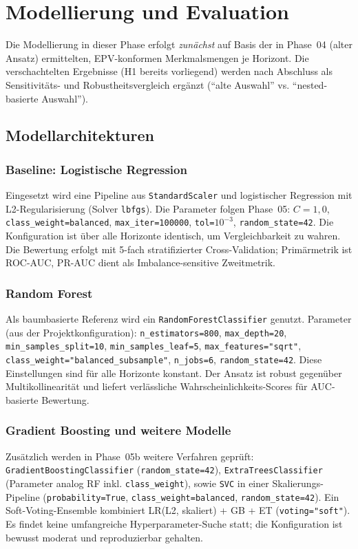 \chapter{Modellierung und Evaluation}

Die Modellierung in dieser Phase erfolgt \emph{zunächst} auf Basis der in Phase~04 (alter Ansatz) ermittelten, EPV-konformen Merkmalsmengen je Horizont. Die verschachtelten Ergebnisse (H1 bereits vorliegend) werden nach Abschluss als Sensitivitäts- und Robustheitsvergleich ergänzt (``alte Auswahl'' vs. ``nested-basierte Auswahl'').

\section{Modellarchitekturen}

\subsection{Baseline: Logistische Regression}
Eingesetzt wird eine Pipeline aus \texttt{StandardScaler} und logistischer Regression mit L2-Regularisierung (Solver \texttt{lbfgs}). Die Parameter folgen Phase~05: \mbox{$C=1{,}0$}, \texttt{class\_weight=balanced}, \texttt{max\_iter=100000}, \texttt{tol=$10^{-3}$}, \texttt{random\_state=42}. Die Konfiguration ist über alle Horizonte identisch, um Vergleichbarkeit zu wahren. Die Bewertung erfolgt mit 5-fach stratifizierter Cross-Validation; Primärmetrik ist ROC-AUC, PR-AUC dient als Imbalance-sensitive Zweitmetrik.

\subsection{Random Forest}
Als baumbasierte Referenz wird ein \texttt{RandomForestClassifier} genutzt. Parameter (aus der Projektkonfiguration): \texttt{n\_estimators=800}, \texttt{max\_depth=20}, \texttt{min\_samples\_split=10}, \texttt{min\_samples\_leaf=5}, \texttt{max\_features="sqrt"}, \texttt{class\_weight="balanced\_subsample"}, \texttt{n\_jobs=6}, \texttt{random\_state=42}. Diese Einstellungen sind für alle Horizonte konstant. Der Ansatz ist robust gegenüber Multi\-kollinearität und liefert verlässliche Wahrscheinlichkeits-Scores für AUC-basierte Bewertung.

\subsection{Gradient Boosting und weitere Modelle}
Zusätzlich werden in Phase~05b weitere Verfahren geprüft: \texttt{GradientBoostingClassifier} (\texttt{random\_state=42}), \texttt{ExtraTreesClassifier} (Parameter analog RF inkl. \texttt{class\_weight}), sowie \texttt{SVC} in einer Skalierungs-Pipeline (\texttt{probability=True}, \texttt{class\_weight=balanced}, \texttt{random\_state=42}). Ein Soft-Voting-Ensemble kombiniert LR(L2, skaliert) + GB + ET (\texttt{voting="soft"}). Es findet keine umfangreiche Hyperparameter-Suche statt; die Konfiguration ist bewusst moderat und reproduzierbar gehalten.



